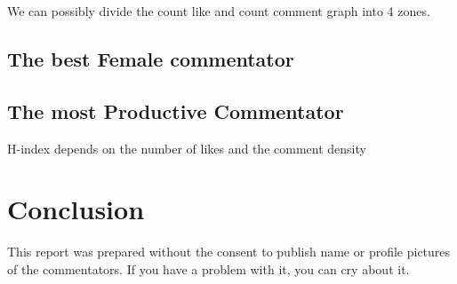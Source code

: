 \documentclass[
	11pt
] {article}
\begin{document}
	We can possibly divide the count like and count comment graph into 4 zones.

\subsection{The best Female commentator}
\subsection{The most Productive Commentator}

	H-index depends on the number of likes and the comment density
\section{Conclusion}
	This report was prepared without the consent to publish name or profile pictures of the commentators. If you have a problem with it, you can cry about it.



\end{document}

